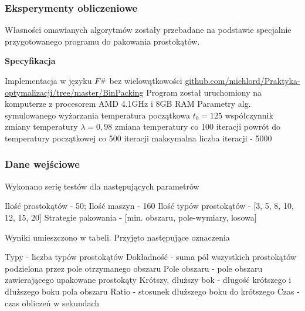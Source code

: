 \documentclass{beamer}
\newcommand{\Fsharp}{%
    {\settoheight{\dimen0}{F}F\kern-.05em \resizebox{!}{\dimen0}{\raisebox{\depth}{\#}}}}
\begin{document}
\begin{frame}
    \frametitle{Eksperymenty obliczeniowe}
    Własności omawianych algorytmów zostały przebadane na podstawie specjalnie przygotowanego
    programu do pakowania prostokątów. \newline
    
    
    \textbf{Specyfikacja}
    \begin{outline}
        \1 Implementacja w języku $\Fsharp$ bez wielowątkowości \newline
         \href{https://github.com/michlord/Praktyka-optymalizacji/tree/master/BinPacking}
         {github.com/michlord/Praktyka-optymalizacji/tree/master/BinPacking} 
        \1 Program został uruchomiony na komputerze z procesorem
         AMD 4.1GHz i 8GB RAM
        \1 Parametry alg. symulowanego wyżarzania
        \2 temperatura początkowa $t_0=125$
        \2 współczynnik zmiany temperatury $\lambda=0,98$
        \2 zmiana temperatury co 100 iteracji
        \2 powrót do temperatury początkowej co 500 iteracji
        \2 maksymalna liczba iteracji - 5000
        
    \end{outline}
    
\end{frame}

\begin{frame}
    \frametitle{Dane wejściowe}
    Wykonano serię testów dla następujących parametrów
    \begin{outline}
        \1 Ilość prostokątów - 50; Ilość maszyn - 160
        \1 Ilość typów prostokątów - [3, 5, 8, 10, 12, 15, 20]
        \1 Strategie pakowania - [min. obszaru, pole-wymiary, losowa]
    \end{outline}
    
    Wyniki umieszczono w tabeli. Przyjęto następujące oznaczenia
    \begin{outline}
        \1 Typy - liczba typów prostokątów
        \1 Dokładność - suma pól wszystkich prostokątów podzielona przez pole otrzymanego obszaru
        \1 Pole obszaru - pole obszaru zawierającego upakowane prostokąty
        \1 Krótszy, dłuższy bok - długość krótszego i dłuższego boku pola obszaru
        \1 Ratio - stosunek dłuższego boku do krótszego
        \1 Czas - czas obliczeń w sekundach
    \end{outline}
\end{frame}
\end{document}
